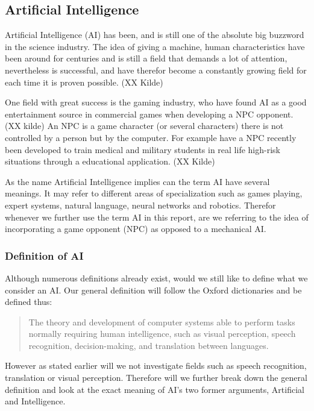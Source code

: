 


\subsection{Artificial Intelligence} \label{sec:ai}
Artificial Intelligence (AI) has been, and is still one of the absolute big buzzword in the science industry.
The idea of giving a machine, human characteristics have been around for centuries and is still a field that demands a lot of attention, \cite {Buchanan2006} nevertheless is successful, \cite {Franz2014} \cite {Varkey2014} and have therefor become a constantly growing field for each time it is proven possible. (XX Kilde)

One field with great success is the gaming industry, who have found AI as a good entertainment source in commercial games when developing a NPC opponent. (XX kilde)   An NPC is a game character (or several characters) there is not controlled by a person but by the computer. \cite {Definition2014}  For example have a NPC recently been developed to train medical and military students in real life high-risk situations through a educational application. (XX Kilde)

As the name Artificial Intelligence implies can the term AI have several meanings. It may refer to different areas of specialization such as games playing, expert systems, natural language, neural networks and robotics. \cite {Vangie2014}
Therefor whenever we further use the term AI in this report, are we referring to the idea of incorporating a game opponent (NPC) as opposed to a mechanical AI.



\subsubsection{Definition of AI}

Although numerous definitions already exist, would we still like to define what we consider an AI. Our general definition will follow the Oxford dictionaries and be defined thus:

		\begin{quote}
		The theory and development of computer systems able to perform tasks normally requiring human 		intelligence, such as visual perception, speech recognition, decision-making, and translation between languages. \cite {Oxford2014}
		\end{quote}

However as stated earlier will we not investigate fields such as speech recognition, translation or visual perception. Therefore will we further break down the general definition and look at the exact meaning of AI's two former arguments, Artificial and Intelligence.

